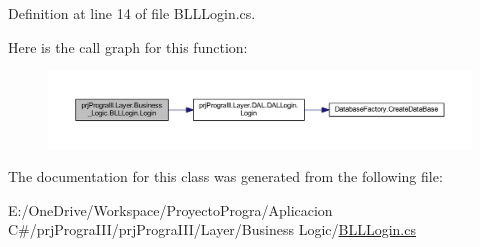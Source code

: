 Definition at line 14 of file B\+L\+L\+Login.\+cs.

Here is the call graph for this function\+:
\nopagebreak
\begin{figure}[H]
\begin{center}
\leavevmode
\includegraphics[width=350pt]{classprj_progra_i_i_i_1_1_layer_1_1_business___logic_1_1_b_l_l_login_a1ce2aab6695b99e4befd53e315168ade_cgraph}
\end{center}
\end{figure}


The documentation for this class was generated from the following file\+:\begin{DoxyCompactItemize}
\item 
E\+:/\+One\+Drive/\+Workspace/\+Proyecto\+Progra/\+Aplicacion C\#/prj\+Progra\+I\+I\+I/prj\+Progra\+I\+I\+I/\+Layer/\+Business Logic/\hyperlink{_b_l_l_login_8cs}{B\+L\+L\+Login.\+cs}\end{DoxyCompactItemize}
